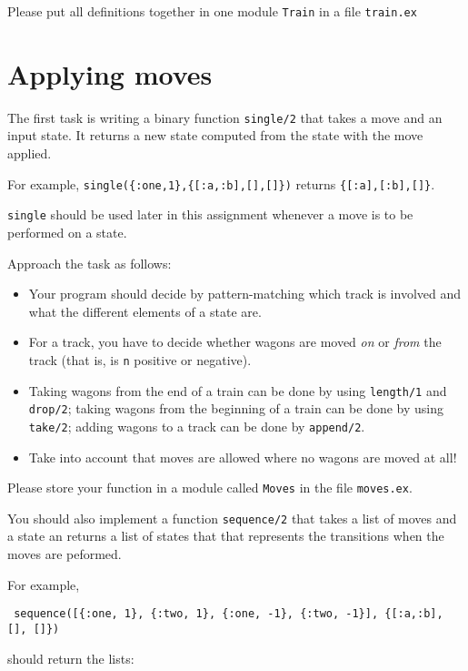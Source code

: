 \documentclass[a4paper,11pt]{article}
\begin{document}
Please put all definitions together in one module {\tt Train} in a file \verb+train.ex+


\section*{Applying moves}

The first task is writing a binary function \verb+single/2+ that
takes a move and an input state. It returns a
new state computed from the state with the move applied.

For example, \verb+single({:one,1},{[:a,:b],[],[]})+ returns
\verb+{[:a],[:b],[]}+.

\verb+single+ should be used later in this assignment whenever a
move is to be performed on a state.

Approach the task as follows:
\begin{itemize}
  
\item Your program should decide by pattern-matching which track
  is involved and what the different elements of a state are.
  
\item For a track, you have to decide whether wagons are moved
  \emph{on} or \emph{from} the track (that is, is \verb+n+  positive
  or negative).
  
\item Taking wagons from the end of a train can be done by using
  \verb+length/1+ and \verb+drop/2+; taking wagons from the beginning of a
  train can be done by using \verb+take/2+; adding wagons to a track
  can be done by \verb+append/2+.

\item Take into account that moves are allowed where no wagons
  are moved at all!
\end{itemize}

Please store your function in a module called \verb+Moves+ in the file {\tt moves.ex}.

You should also implement a function {\tt sequence/2} that takes a
list of moves and a state an returns a list of states that that
represents the transitions when the moves are peformed.

For example,

\begin{verbatim}
 sequence([{:one, 1}, {:two, 1}, {:one, -1}, {:two, -1}], {[:a,:b], [], []})
\end{verbatim}

should return the lists:
\end{document}
